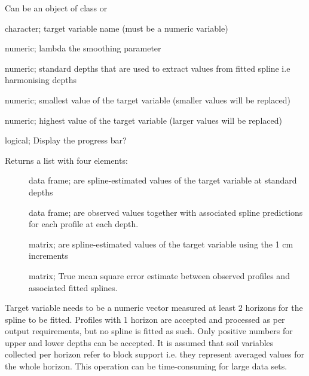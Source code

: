 \documentclass[a4paper]{book}
\begin{document}
\begin{Arguments}
\begin{ldescription}
\item[\code{obj}] Can be an object of class  or 
\item[\code{var.name}] character; target variable name (must be a numeric variable)    
\item[\code{lam}] numeric; lambda the smoothing parameter
\item[\code{d}] numeric; standard depths that are used to extract values from fitted spline i.e harmonising depths
\item[\code{vlow}] numeric; smallest value of the target variable (smaller values will be replaced)
\item[\code{vhigh}] numeric; highest value of the target variable (larger values will be replaced)
\item[\code{show.progress}] logical; Display the progress bar?
\end{ldescription}
\end{Arguments}
%
\begin{Value}
Returns a list with four elements:
\begin{description}

\item[] data frame; are spline-estimated values of the target variable at standard depths
\item[] data frame; are observed values together with associated spline predictions for each profile at each depth.
\item[] matrix; are spline-estimated values of the target variable using the 1 cm increments 
\item[] matrix; True mean square error estimate between observed profiles and associated fitted splines.


\end{description}

\end{Value}
%
\begin{Note}
Target variable needs to be a numeric vector measured at least 2 horizons for the spline to be fitted. Profiles with 1 horizon are accepted and processed as per output requirements, but no spline is fitted as such. Only positive numbers for upper and lower depths can be accepted. It is assumed that soil variables collected per horizon refer to block support i.e. they represent averaged values for the whole horizon. This operation can be time-consuming for large data sets.
\end{Note}
\end{document}

